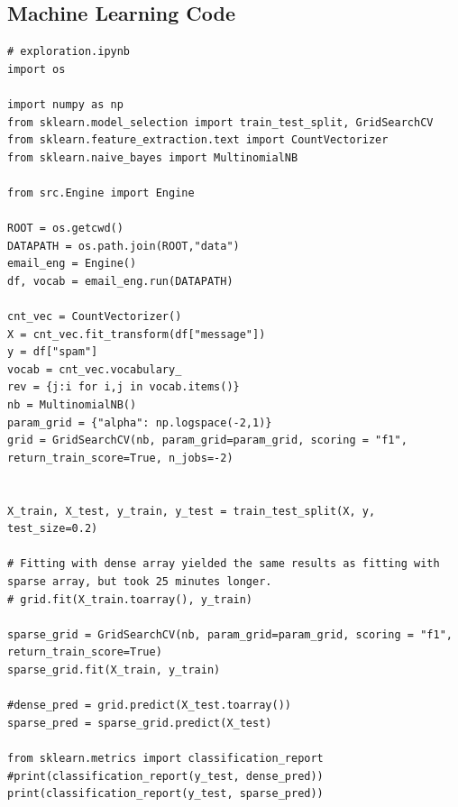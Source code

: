 \documentclass[10pt,a4paper]{article}
\begin{document}
\subsection{Machine Learning Code}
\begin{lstlisting}
# exploration.ipynb
import os

import numpy as np
from sklearn.model_selection import train_test_split, GridSearchCV
from sklearn.feature_extraction.text import CountVectorizer
from sklearn.naive_bayes import MultinomialNB

from src.Engine import Engine

ROOT = os.getcwd()
DATAPATH = os.path.join(ROOT,"data")
email_eng = Engine()
df, vocab = email_eng.run(DATAPATH)

cnt_vec = CountVectorizer()
X = cnt_vec.fit_transform(df["message"])
y = df["spam"]
vocab = cnt_vec.vocabulary_
rev = {j:i for i,j in vocab.items()}
nb = MultinomialNB()
param_grid = {"alpha": np.logspace(-2,1)}
grid = GridSearchCV(nb, param_grid=param_grid, scoring = "f1", return_train_score=True, n_jobs=-2)


X_train, X_test, y_train, y_test = train_test_split(X, y, test_size=0.2)

# Fitting with dense array yielded the same results as fitting with sparse array, but took 25 minutes longer.
# grid.fit(X_train.toarray(), y_train)

sparse_grid = GridSearchCV(nb, param_grid=param_grid, scoring = "f1", return_train_score=True)
sparse_grid.fit(X_train, y_train)

#dense_pred = grid.predict(X_test.toarray())
sparse_pred = sparse_grid.predict(X_test)

from sklearn.metrics import classification_report
#print(classification_report(y_test, dense_pred))
print(classification_report(y_test, sparse_pred))

\end{lstlisting}
\end{document}
